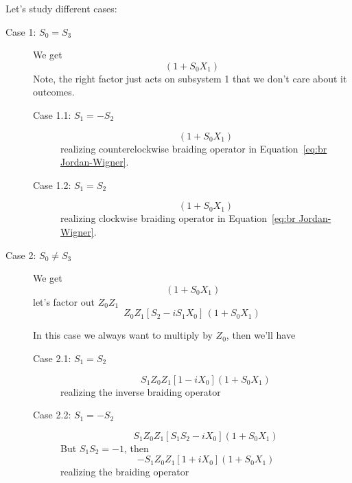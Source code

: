 \documentclass{article}
\begin{document}
Let's study different cases:
\begin{description}
	\item[Case 1: $ S_0 = S_3 $]
	      We get \begin{equation*}
		      [1 -i X_0 S_2 S_1] (1 + S_0 X_1)
	      \end{equation*}
	      Note, the right factor just acts on subsystem 1 that we don't care about
	      it outcomes.

	      \begin{description}
		      \item[Case 1.1: $ S_1 = -S_2 $]
		            \begin{equation*}
			            [1 + i X_0] (1 + S_0 X_1)
		            \end{equation*}
		            realizing counterclockwise braiding operator in Equation~\ref{eq:br Jordan-Wigner}.
		      \item[Case 1.2: $ S_1 = S_2 $]
		            \begin{equation*}
			            [1 - i X_0] (1 + S_0 X_1)
		            \end{equation*}
		            realizing clockwise braiding operator in Equation~\ref{eq:br Jordan-Wigner}.
	      \end{description}

	\item[Case 2: $ S_0 \ne S_3 $]
	      We get \begin{equation*}
		      [S_2 Z_0 Z_1 + S_1 Y_0 Z_1]\, (1 + S_0 X_1)
	      \end{equation*}
	      let's factor out $ Z_0 Z_1 $
	      \begin{equation*}
		      Z_0 Z_1 [S_2 - i S_1 X_0]\, (1 + S_0 X_1)
	      \end{equation*}

	      In this case we always want to multiply by $ Z_0 $, then we'll have
	      \begin{description}
		      \item[Case 2.1: $ S_1 = S_2 $]
		            \begin{equation*}
			            S_1 Z_0 Z_1 [1 - i X_0] (1 + S_0 X_1)
		            \end{equation*}
		            realizing the inverse braiding operator
		      \item[Case 2.2: $ S_1 = - S_2 $]
		            \begin{equation*}
			            S_1 Z_0 Z_1 [S_1 S_2 - i X_0] (1 + S_0 X_1)
		            \end{equation*}
		            But $ S_1 S_2 = -1 $, then
		            \begin{equation*}
			            - S_1 Z_0 Z_1 [1 + i X_0] (1 + S_0 X_1)
		            \end{equation*}
		            realizing the braiding operator
	      \end{description}
\end{description}
\end{document}
